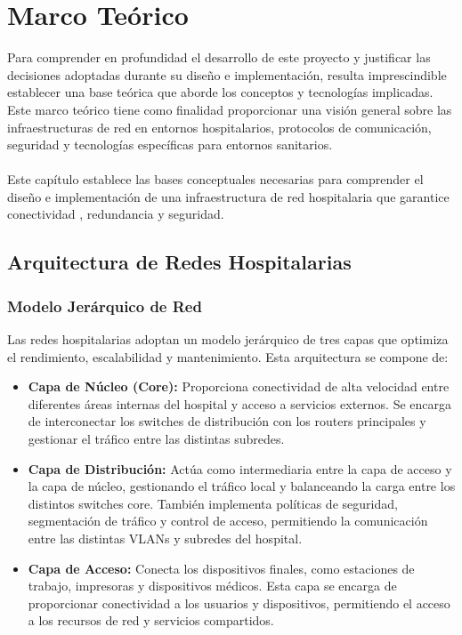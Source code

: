 
\chapter{Marco Teórico}\label{MarcoTeórico}
Para comprender en profundidad el desarrollo de este proyecto y justificar las decisiones adoptadas durante su diseño e implementación, resulta imprescindible establecer 
una base teórica que aborde los conceptos y tecnologías implicadas. Este marco teórico tiene como finalidad proporcionar una visión general sobre las 
infraestructuras de red en entornos hospitalarios, protocolos de comunicación, seguridad y tecnologías específicas para entornos sanitarios.\\ \\

Este capítulo establece las bases conceptuales necesarias para comprender el diseño e implementación de una infraestructura de red hospitalaria que garantice conectividad
, redundancia y seguridad.

\section{Arquitectura de Redes Hospitalarias}

\subsection{Modelo Jerárquico de Red}
Las redes hospitalarias adoptan un modelo jerárquico de tres capas que optimiza el rendimiento, escalabilidad y mantenimiento. Esta arquitectura se compone de:
\begin{itemize}
    \item \textbf{Capa de Núcleo (Core):} Proporciona conectividad de alta velocidad entre diferentes áreas internas del hospital y acceso a servicios externos. Se encarga de 
    interconectar los switches de distribución con los routers principales y gestionar el tráfico entre las distintas subredes.
    \item \textbf{Capa de Distribución:} Actúa como intermediaria entre la capa de acceso y la capa de núcleo, gestionando el tráfico local y balanceando la carga
    entre los distintos switches core. También implementa políticas de seguridad, segmentación de tráfico y control de acceso, permitiendo la comunicación entre las distintas 
    VLANs y subredes del hospital.
    \item \textbf{Capa de Acceso:} Conecta los dispositivos finales, como estaciones de trabajo, impresoras y dispositivos médicos. Esta capa se encarga de proporcionar
    conectividad a los usuarios y dispositivos, permitiendo el acceso a los recursos de red y servicios compartidos. 
\end{itemize}
